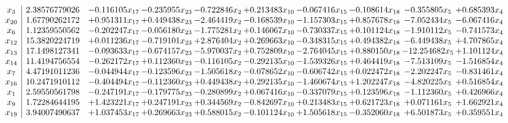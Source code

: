 \documentclass[10pt]{article}
\begin{document}
 \[\begin{array}{c| c c@{\hskip 2pt} c@{\hskip 2pt} c@{\hskip 2pt} c@{\hskip 2pt} c@{\hskip 2pt} c@{\hskip 2pt} c@{\hskip 2pt} c@{\hskip 2pt} }
 x_{3}   &  2.38576779026 & -0.116105 x_{17} & -0.235955 x_{23} & -0.722846 x_{2} & + 0.213483 x_{10} & -0.067416 x_{15} & -0.108614 x_{18} & -0.355805 x_{5} & + 0.685393 x_{4}\\
 x_{20}   &  1.67790262172 & + 0.951311 x_{17} & + 0.449438 x_{23} & -2.464419 x_{2} & -0.168539 x_{10} & -1.157303 x_{15} & + 0.857678 x_{18} & -7.052434 x_{5} & -6.067416 x_{4}\\
 x_{6}   &  1.12359550562 & -0.202247 x_{17} & -0.056180 x_{23} & -1.775281 x_{2} & + 0.146067 x_{10} & -0.730337 x_{15} & + 0.101124 x_{18} & -1.910112 x_{5} & -0.741573 x_{4}\\
 x_{12}   &  15.3820224719 & + 0.011236 x_{17} & -0.719101 x_{23} & + 2.876404 x_{2} & + 0.269663 x_{10} & -0.348315 x_{15} & + 0.494382 x_{18} & -6.449438 x_{5} & + 4.707865 x_{4}\\
 x_{13}   &  17.1498127341 & -0.093633 x_{17} & -0.674157 x_{23} & -5.970037 x_{2} & + 0.752809 x_{10} & -2.764045 x_{15} & + 0.880150 x_{18} & -12.254682 x_{5} & + 1.101124 x_{4}\\
 x_{14}   &  11.4194756554 & -0.262172 x_{17} & + 0.112360 x_{23} & -0.116105 x_{2} & -0.292135 x_{10} & -1.539326 x_{15} & + 0.464419 x_{18} & -7.513109 x_{5} & -1.516854 x_{4}\\
 x_{7}   &  4.47191011236 & -0.044944 x_{17} & -0.123596 x_{23} & -1.505618 x_{2} & -0.078652 x_{10} & -0.606742 x_{15} & + 0.022472 x_{18} & -2.202247 x_{5} & -0.831461 x_{4}\\
 x_{16}   &  10.2471910112 & -0.404494 x_{17} & -0.112360 x_{23} & + 0.449438 x_{2} & + 0.292135 x_{10} & -1.460674 x_{15} & + 1.202247 x_{18} & -4.820225 x_{5} & + 0.516854 x_{4}\\
 x_{1}   &  2.59550561798 & -0.247191 x_{17} & -0.179775 x_{23} & -0.280899 x_{2} & + 0.067416 x_{10} & -0.337079 x_{15} & + 0.123596 x_{18} & -1.112360 x_{5} & + 0.426966 x_{4}\\
 x_{9}   &  1.72284644195 & + 1.423221 x_{17} & + 0.247191 x_{23} & + 0.344569 x_{2} & -0.842697 x_{10} & + 0.213483 x_{15} & + 0.621723 x_{18} & + 0.071161 x_{5} & + 1.662921 x_{4}\\
 x_{19}   &  3.94007490637 & + 1.037453 x_{17} & + 0.269663 x_{23} & + 0.588015 x_{2} & -0.101124 x_{10} & + 1.505618 x_{15} & -0.352060 x_{18} & + 6.501873 x_{5} & + 0.359551 x_{4}\\

\end{array}\]
\end{document}
